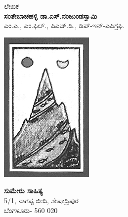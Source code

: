 \thispagestyle{empty}


ಲೇಖಕ\\\textbf{ಸಂತೇಬಾಚಹಳ್ಳಿ ಡಾ.ಎಸ್​.ನಂಜುಂಡಸ್ವಾಮಿ}\\ ಎಂ.ಎ., ಎಂ.ಫಿಲ್​., ಪಿಎಚ್​.ಡಿ., ಡಿಪ್​-ಇನ್​-ಎಪಿಗ್ರಫಿ.

\begin{center}
\includegraphics{images/logo.png}
\end{center}

\begin{center}
\textbf{ಸುಮೇರು ಸಾಹಿತ್ಯ}\\ 5/1, ನಾಗಪ್ಪ ಬೀದಿ, ಶೇಷಾದ್ರಿಪುರ\\ ಬೆಂಗಳೂರು- 560 020
\end{center}

